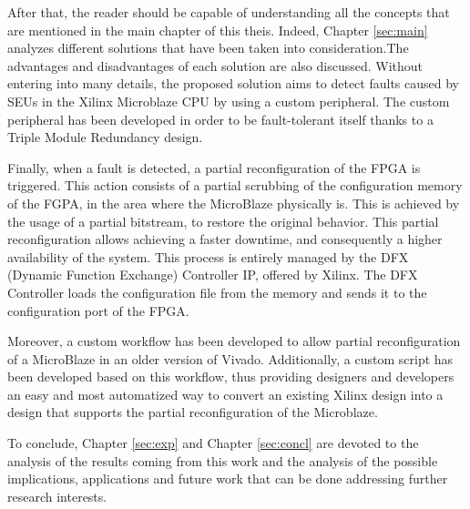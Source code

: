 After that, the reader should be capable of understanding all the concepts that are mentioned in the main chapter of this theis. Indeed, Chapter \ref{sec:main} analyzes different solutions that have been taken into consideration.The advantages and disadvantages of each solution are also discussed. Without entering into many details, the proposed solution aims to detect faults caused by SEUs in the Xilinx Microblaze CPU by using a custom peripheral. The custom peripheral has been developed in order to be fault-tolerant itself thanks to a Triple Module Redundancy design.\bigskip

Finally, when a fault is detected, a partial reconfiguration of the FPGA is triggered. This action consists of a partial scrubbing of the configuration memory of the FGPA, in the area where the MicroBlaze physically is. This is achieved by the usage of a partial bitstream, to restore the original behavior. This partial reconfiguration allows achieving a faster downtime, and consequently a higher availability of the system. This process is entirely managed by the DFX (Dynamic Function Exchange) Controller IP, offered by Xilinx. The DFX Controller loads the configuration file from the memory and sends it to the configuration port of the FPGA. \bigskip

Moreover, a custom workflow has been developed to allow partial reconfiguration of a MicroBlaze in an older version of Vivado. Additionally, a custom script has been developed based on this workflow, thus providing designers and developers an easy and most automatized way to convert an existing Xilinx design into a design that supports the partial reconfiguration of the Microblaze.\bigskip

To conclude, Chapter \ref{sec:exp} and Chapter \ref{sec:concl} are devoted to the analysis of the results coming from this work and the analysis of the possible implications, applications and future work that can be done addressing further research interests.

